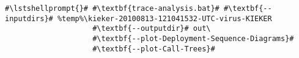 \begin{lstlisting}[caption=Commands to produce the diagrams under Windows,label=lst:traceAnalysis:sequenceDiagramWin]
#\lstshellprompt{}# #\textbf{trace-analysis.bat}# #\textbf{--inputdirs}# %temp%\kieker-20100813-121041532-UTC-virus-KIEKER
                    #\textbf{--outputdir}# out\
                    #\textbf{--plot-Deployment-Sequence-Diagrams}#
                    #\textbf{--plot-Call-Trees}#		
\end{lstlisting}
